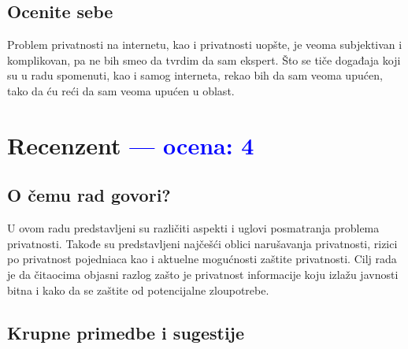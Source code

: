 \documentclass[a4paper]{report}
\newcommand{\odgovor}[1]{\textcolor{blue}{#1}}
\begin{document}
\section{Ocenite sebe}
Problem privatnosti na internetu, kao i privatnosti uopšte, je veoma subjektivan i komplikovan, pa ne bih smeo da tvrdim da sam ekspert. Što se tiče događaja koji su u radu spomenuti, kao i samog interneta, rekao bih da sam veoma upućen, tako da ću reći da sam veoma upućen u oblast.


\chapter{Recenzent \odgovor{--- ocena: 4} }


\section{O čemu rad govori?}

U ovom radu predstavljeni su različiti aspekti i uglovi posmatranja problema privatnosti. Takođe su predstavljeni najčešći oblici narušavanja privatnosti, rizici po privatnost pojedniaca kao i aktuelne mogućnosti zaštite privatnosti. Cilj rada je da čitaocima objasni razlog zašto je privatnost informacije koju izlažu javnosti bitna i kako da se zaštite od potencijalne zloupotrebe. 

\section{Krupne primedbe i sugestije}
\end{document}
